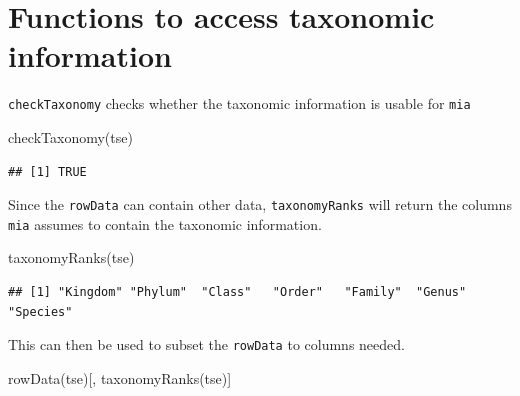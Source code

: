 \documentclass[
]{book}
\newenvironment{Shaded}{\begin{snugshade}}{\end{snugshade}}
\newcommand{\FunctionTok}[1]{\textcolor[rgb]{0.00,0.00,0.00}{#1}}
\newcommand{\NormalTok}[1]{#1}
\begin{document}
\hypertarget{functions-to-access-taxonomic-information}{%
\section{Functions to access taxonomic information}\label{functions-to-access-taxonomic-information}}

\texttt{checkTaxonomy} checks whether the taxonomic information is usable for \texttt{mia}

\begin{Shaded}
\begin{Highlighting}[]
\FunctionTok{checkTaxonomy}\NormalTok{(tse)}
\end{Highlighting}
\end{Shaded}

\begin{verbatim}
## [1] TRUE
\end{verbatim}

Since the \texttt{rowData} can contain other data, \texttt{taxonomyRanks} will return the
columns \texttt{mia} assumes to contain the taxonomic information.

\begin{Shaded}
\begin{Highlighting}[]
\FunctionTok{taxonomyRanks}\NormalTok{(tse)}
\end{Highlighting}
\end{Shaded}

\begin{verbatim}
## [1] "Kingdom" "Phylum"  "Class"   "Order"   "Family"  "Genus"   "Species"
\end{verbatim}

This can then be used to subset the \texttt{rowData} to columns needed.

\begin{Shaded}
\begin{Highlighting}[]
\FunctionTok{rowData}\NormalTok{(tse)[, }\FunctionTok{taxonomyRanks}\NormalTok{(tse)]}
\end{Highlighting}
\end{Shaded}
\end{document}

